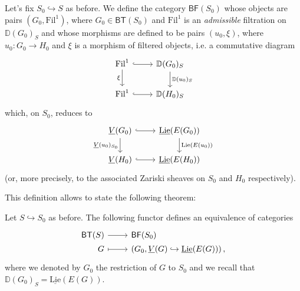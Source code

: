 \begin{defn}[]
	Let's fix $S_0 \hookrightarrow S$ as before.
	We define the category $\mathsf{BF}(S_0)$ whose objects
	are pairs $(G_0, \mathrm{Fil}^1)$, where $G_0 \in \mathsf{BT}(S_0)$
	and $\mathrm{Fil}^1$ is an {\em admissible} filtration on
	$\mathbb{D}(G_0)_S$ and whose morphisms are defined to be
	pairs $(u_0, \xi)$, where $u_0\colon G_0 \to H_0$
	and $\xi$ is a morphism of filtered objects, i.e. a commutative diagram
	\begin{equation*}
	\begin{tikzcd}
		\mathrm{Fil}^1 \arrow[d, "\xi"', rightarrow] 
		\arrow[r, "", hookrightarrow] &
		\mathbb{D}(G_0)_S 
		\arrow[d, "\mathbb{D}(u_0)_S", rightarrow] \\
		\mathrm{Fil}^1 \arrow[r, "", hookrightarrow] &
		\mathbb{D}(H_0)_S
	\end{tikzcd}
	\end{equation*}
	which, on $S_0$, reduces to
	\begin{equation*}
	\begin{tikzcd}
		\underline{V}(G_0) \arrow[r, "", hookrightarrow] 
		\arrow[d, "\underline{V}(u_0)_{S_0}"', rightarrow] &
		\underline{\mathrm{Lie}}(E(G_0))
		\arrow[d, "\mathrm{Lie}(E(u_0))", rightarrow] \\
		\underline{V}(H_0) \arrow[r, "", hookrightarrow] &
		\underline{\mathrm{Lie}}(E(H_0))
	\end{tikzcd}
	\end{equation*}
	(or, more precisely, to the associated Zariski sheaves on $S_0$
	and $H_0$ respectively).
\end{defn}


\noindent
This definition allows to state the following theorem:
\begin{thm}\label{thm:EquivCatBTS}
	Let $S \hookrightarrow S_0$ as before.
	The following functor defines an equivalence of categories
	\begin{equation*}
	\begin{tikzcd}[row sep = 0ex
		,/tikz/column 1/.append style={anchor=base east}
		,/tikz/column 2/.append style={anchor=base west}]
		\mathsf{BT}(S) \arrow[r, "", rightarrow] &
		\mathsf{BF}(S_0) \\
		G \arrow[r, "", mapsto] & 
		\left(G_0, \underline{V}(G) \hookrightarrow \underline{\mathrm{Lie}}(E(G))\right)
	,\end{tikzcd}
	\end{equation*} 
	where we denoted by $G_0$ the restriction of $G$ to $S_0$
	and we recall that $\mathbb{D}(G_0)_S = \underline{\mathrm{Lie}}(E(G))$.
\end{thm}


